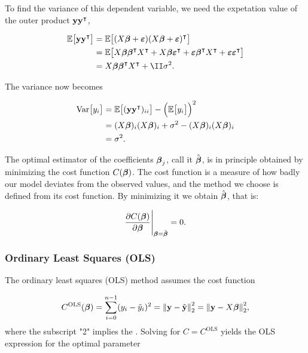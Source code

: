 To find the variance of this dependent variable, we need the expetation value of the outer product $\mathbf{y}\mathbf{y}^\intercal$,

\begin{align}
    \EE{\vec{y} \vec{y}\TT} &= \EE{(X\svec{\beta} + \svec{\epsilon})(X\svec{\beta} + \svec{\epsilon})\TT} \nonumber\\
    &= \EE{\Xb \svec{\beta}\TT X\TT + \Xb \svec{\epsilon}\TT + \svec{\epsilon}\svec{\beta}\TT X\TT + \svec{\epsilon} \svec{\epsilon}\TT} \nonumber \\
    &= \Xb \svec{\beta}\TT X\TT + \II \sigma^2. \label{eq:expectation_yyT}
\end{align}

The variance now becomes

\begin{align*}
    \text{Var}\big[y_i\big] &= \mathbb{E}\big[(\mathbf{y}\mathbf{y}^\intercal)_{ii}\big] -\Big(\mathbb{E}\big[y_i\big]\Big)^2\\
    &= (X\boldsymbol{\beta})_{i} (X\boldsymbol{\beta})_{i} + \sigma^2 - (X\boldsymbol{\beta})_{i} (X\boldsymbol{\beta})_{i}\\
    &= \sigma^2.
\end{align*}


The optimal estimator of the coefficients $\boldsymbol{\beta}_j$, call it $\hat{\boldsymbol{\beta}}$, is in principle obtained by minimizing the cost function $C(\boldsymbol{\beta})$. The cost function is a measure of how badly our model deviates from the observed values, and the method we choose is defined from its cost function. By minimizing it we obtain $\hat{\boldsymbol{\beta}}$, that is:

\begin{align}
    \pdv{C(\boldsymbol{\beta})}{\boldsymbol{\beta}}\Bigg|_{\boldsymbol{\beta}=\hat{\boldsymbol{\beta}}} = 0.
    \label{eq:general_LS}
\end{align}




\subsubsection{Ordinary Least Squares (OLS)}\label{sec:OLS}

The ordinary least squares (OLS) method assumes the cost function

\begin{align*}
    C^\text{OLS}(\boldsymbol{\beta}) = \sum_{i=0}^{n-1}(y_i - \tilde{y}_i)^2 =  \norm{\mathbf{y}-\tilde{\mathbf{y}}}_2^{2} = \norm{\mathbf{y}-X\boldsymbol{\beta}}_2^{2},
\end{align*}
where the subscript "2" implies the \footnotemark. Solving  for $C=C^\text{OLS}$ yields the OLS expression for the optimal parameter

